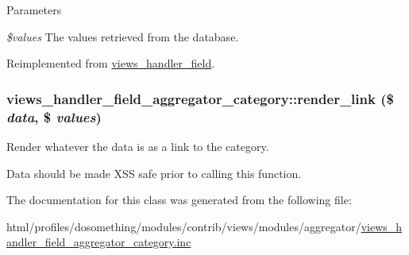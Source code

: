 \begin{DoxyParams}{Parameters}
\item[{\em \$values}]The values retrieved from the database. \end{DoxyParams}


Reimplemented from \hyperlink{classviews__handler__field_a82ff951c5e9ceb97b2eab86f880cbc1e}{views\_\-handler\_\-field}.\hypertarget{classviews__handler__field__aggregator__category_aed3df98f87fc7d2e61ff3206505e2822}{
\subsubsection[{render\_\-link}]{\setlength{\rightskip}{0pt plus 5cm}views\_\-handler\_\-field\_\-aggregator\_\-category::render\_\-link (\$ {\em data}, \/  \$ {\em values})}}
\label{classviews__handler__field__aggregator__category_aed3df98f87fc7d2e61ff3206505e2822}
Render whatever the data is as a link to the category.

Data should be made XSS safe prior to calling this function. 

The documentation for this class was generated from the following file:\begin{DoxyCompactItemize}
\item 
html/profiles/dosomething/modules/contrib/views/modules/aggregator/\hyperlink{views__handler__field__aggregator__category_8inc}{views\_\-handler\_\-field\_\-aggregator\_\-category.inc}\end{DoxyCompactItemize}
